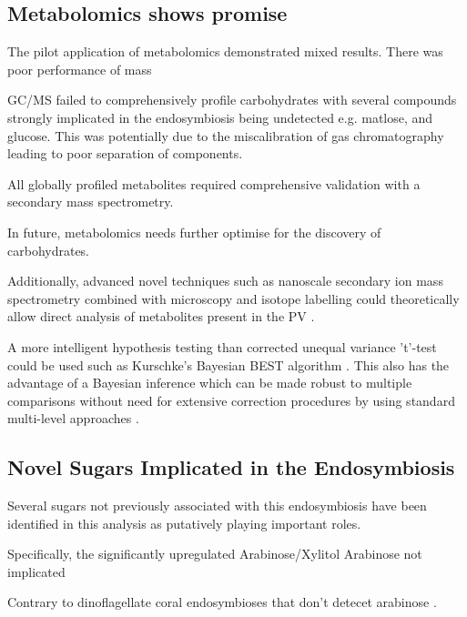 \subsection{Metabolomics shows promise}

The pilot application of metabolomics demonstrated mixed results.
There was poor performance of mass

GC/MS failed to comprehensively profile carbohydrates with 
several compounds strongly implicated in the endosymbiosis
being undetected e.g. matlose, and glucose.  This was potentially
due to the miscalibration of gas chromatography leading to poor 
separation of components. 

All globally profiled metabolites required comprehensive validation
with a secondary mass spectrometry. 






In future, metabolomics needs further optimise for 
the discovery of carbohydrates. 

Additionally, advanced novel techniques such as nanoscale 
secondary ion mass spectrometry combined with 
microscopy and isotope labelling could theoretically allow direct analysis 
of metabolites present in the PV \citep{Kopp2015,Legin2014}.



A more intelligent hypothesis testing than corrected unequal variance 't'-test
could be used such as Kurschke's Bayesian BEST algorithm \citep{Kruschke2013}.
This also has the advantage of a Bayesian inference which can be 
made robust to multiple comparisons without need for extensive correction
procedures by using standard multi-level approaches \citep{Gelman2009}.




\subsection{Novel Sugars Implicated in the Endosymbiosis}

Several sugars not previously associated with this endosymbiosis
have been identified in this analysis as putatively
playing important roles. 



Specifically, the significantly upregulated 
Arabinose/Xylitol
Arabinose not implicated

Contrary to dinoflagellate coral endosymbioses
that don't detecet arabinose \citep{Markell1993}.




